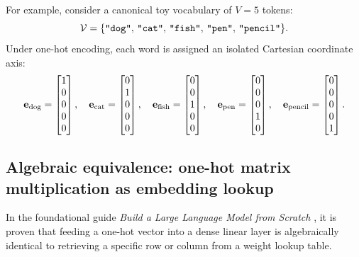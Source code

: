 \documentclass[../../../main.tex]{subfiles}
\begin{document}
For example, consider a canonical toy vocabulary of $V=5$ tokens:
\begin{equation}
\label{eq:toy_vocab}
\mathcal{V} = \{\text{\texttt{"dog"}}, \, \text{\texttt{"cat"}}, \, \text{\texttt{"fish"}}, \, \text{\texttt{"pen"}}, \, \text{\texttt{"pencil"}}\}.
\end{equation}
Under one-hot encoding, each word is assigned an isolated Cartesian coordinate axis:
\begin{equation}
\label{eq:toy_onehots}
\mathbf{e}_{\text{dog}} = \begin{bmatrix} 1 \\ 0 \\ 0 \\ 0 \\ 0 \end{bmatrix}, \quad
\mathbf{e}_{\text{cat}} = \begin{bmatrix} 0 \\ 1 \\ 0 \\ 0 \\ 0 \end{bmatrix}, \quad
\mathbf{e}_{\text{fish}} = \begin{bmatrix} 0 \\ 0 \\ 1 \\ 0 \\ 0 \end{bmatrix}, \quad
\mathbf{e}_{\text{pen}} = \begin{bmatrix} 0 \\ 0 \\ 0 \\ 1 \\ 0 \end{bmatrix}, \quad
\mathbf{e}_{\text{pencil}} = \begin{bmatrix} 0 \\ 0 \\ 0 \\ 0 \\ 1 \end{bmatrix}.
\end{equation}

\subsection{Algebraic equivalence: one-hot matrix multiplication as embedding lookup}
\label{subsec:onehot_lookup_proof}

In the foundational guide \emph{Build a Large Language Model from Scratch} \cite{raschka2024llm}, it is proven that feeding a one-hot vector into a dense linear layer is algebraically identical to retrieving a specific row or column from a weight lookup table.
\end{document}
